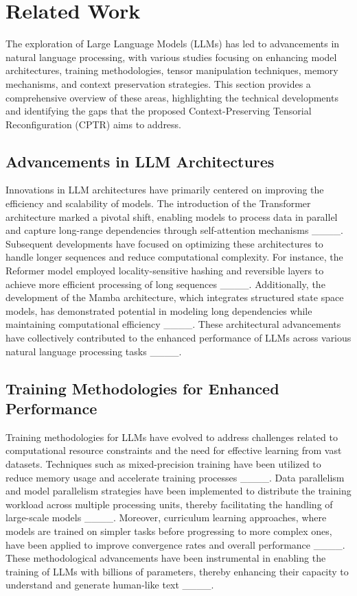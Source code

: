 \section{Related Work}
The exploration of Large Language Models (LLMs) has led to advancements in natural language processing, with various studies focusing on enhancing model architectures, training methodologies, tensor manipulation techniques, memory mechanisms, and context preservation strategies. This section provides a comprehensive overview of these areas, highlighting the technical developments and identifying the gaps that the proposed Context-Preserving Tensorial Reconfiguration (CPTR) aims to address.

\subsection{Advancements in LLM Architectures}

Innovations in LLM architectures have primarily centered on improving the efficiency and scalability of models. The introduction of the Transformer architecture marked a pivotal shift, enabling models to process data in parallel and capture long-range dependencies through self-attention mechanisms ____. Subsequent developments have focused on optimizing these architectures to handle longer sequences and reduce computational complexity. For instance, the Reformer model employed locality-sensitive hashing and reversible layers to achieve more efficient processing of long sequences ____. Additionally, the development of the Mamba architecture, which integrates structured state space models, has demonstrated potential in modeling long dependencies while maintaining computational efficiency ____. These architectural advancements have collectively contributed to the enhanced performance of LLMs across various natural language processing tasks ____.

\subsection{Training Methodologies for Enhanced Performance}

Training methodologies for LLMs have evolved to address challenges related to computational resource constraints and the need for effective learning from vast datasets. Techniques such as mixed-precision training have been utilized to reduce memory usage and accelerate training processes ____. Data parallelism and model parallelism strategies have been implemented to distribute the training workload across multiple processing units, thereby facilitating the handling of large-scale models ____. Moreover, curriculum learning approaches, where models are trained on simpler tasks before progressing to more complex ones, have been applied to improve convergence rates and overall performance ____. These methodological advancements have been instrumental in enabling the training of LLMs with billions of parameters, thereby enhancing their capacity to understand and generate human-like text ____.

